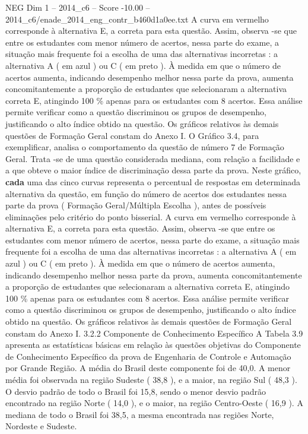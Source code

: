 \begin{textsample}{NEG Dim 1 – 2014\_c6 – Score -10.00 – 2014\_c6/enade\_2014\_eng\_contr\_b460d1a0ee.txt}
A curva em vermelho corresponde à alternativa E, a correta para esta questão.
Assim, observa -se que entre os estudantes com menor número de acertos, nessa parte do exame, a situação mais frequente foi a escolha de uma das alternativas incorretas : a alternativa A ( em azul ) ou C ( em preto ).
À medida em que o número de acertos aumenta, indicando desempenho melhor nessa parte da prova, aumenta concomitantemente a proporção de estudantes que selecionaram a alternativa correta E, atingindo 100 \% apenas para os estudantes com 8 acertos.
Essa análise permite verificar como a questão discriminou os grupos de desempenho, justificando o alto índice obtido na questão.
Os gráficos relativos às demais questões de Formação Geral constam do Anexo I.
O Gráfico 3.4, para exemplificar, analisa o comportamento da questão de número 7 de Formação Geral.
Trata -se de uma questão considerada mediana, com relação a facilidade e a que obteve o maior índice de discriminação dessa parte da prova.
Neste gráfico, \textbf{cada} uma das cinco curvas representa o percentual de respostas em determinada alternativa da questão, em função do número de acertos dos estudantes nessa parte da prova ( Formação Geral/Múltipla Escolha ), antes de possíveis eliminações pelo critério do ponto bisserial.
A curva em vermelho corresponde à alternativa E, a correta para esta questão.
Assim, observa -se que entre os estudantes com menor número de acertos, nessa parte do exame, a situação mais frequente foi a escolha de uma das alternativas incorretas : a alternativa A ( em azul ) ou C ( em preto ).
À medida em que o número de acertos aumenta, indicando desempenho melhor nessa parte da prova, aumenta concomitantemente a proporção de estudantes que selecionaram a alternativa correta E, atingindo 100 \% apenas para os estudantes com 8 acertos.
Essa análise permite verificar como a questão discriminou os grupos de desempenho, justificando o alto índice obtido na questão.
Os gráficos relativos às demais questões de Formação Geral constam do Anexo I. 3.2.2 Componente de Conhecimento Específico A Tabela 3.9 apresenta as estatísticas básicas em relação às questões objetivas do Componente de Conhecimento Específico da prova de Engenharia de Controle e Automação por Grande Região.
A média do Brasil deste componente foi de 40,0.
A menor média foi observada na região Sudeste ( 38,8 ), e a maior, na região Sul ( 48,3 ).
O desvio padrão de todo o Brasil foi 15,8, sendo o menor desvio padrão encontrado na região Norte ( 14,0 ), e o maior, na região Centro-Oeste ( 16,9 ).
A mediana de todo o Brasil foi 38,5, a mesma encontrada nas regiões Norte, Nordeste e Sudeste.

\end{textsample}
